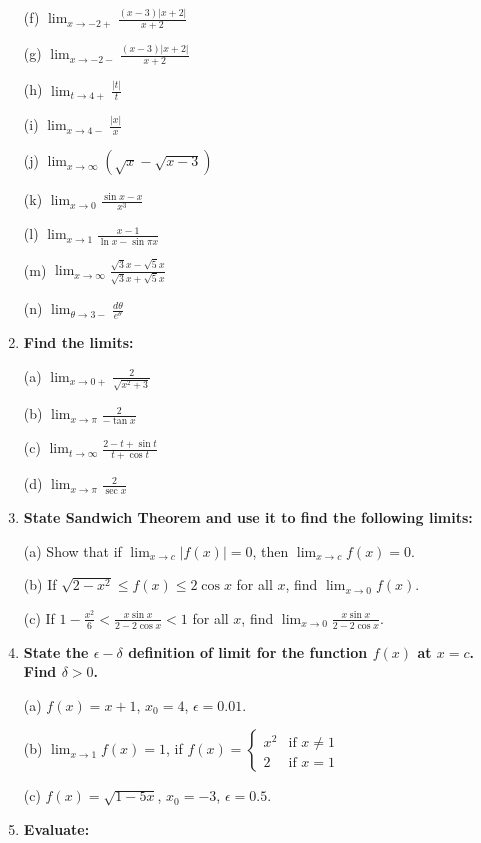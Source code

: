 \documentclass{article}
\begin{document}
\begin{enumerate}
(f) $\lim_{x \to -2+} \frac{(x - 3)|x + 2|}{x + 2}$


(g) $\lim_{x \to -2-} \frac{(x - 3)|x + 2|}{x + 2}$

(h) $\lim_{t \to 4+} \frac{|t|}{t}$

(i) $\lim_{x \to 4-} \frac{|x|}{x}$

(j) $\lim_{x \to \infty} \left(\sqrt{x} - \sqrt{x - 3}\right)$

(k) $\lim_{x \to 0} \frac{\sin x - x}{x^3}$

(l) $\lim_{x \to 1} \frac{x - 1}{\ln x - \sin \pi x}$

(m) $\lim_{x \to \infty} \frac{\sqrt{3} x - \sqrt{5} x}{\sqrt{3} x + \sqrt{5} x}$

(n) $\lim_{\theta \to 3-} \frac{d\theta}{e^{\theta}}$

\item \textbf{Find the limits:}

(a) $\lim_{x \to 0+} \frac{2}{\sqrt{x^2 + 3}}$

(b) $\lim_{x \to \pi} \frac{2}{-\tan x}$

(c) $\lim_{t \to \infty} \frac{2 - t + \sin t}{t + \cos t}$

(d) $\lim_{x \to \pi} \frac{2}{\sec x}$

\item \textbf{State Sandwich Theorem and use it to find the following limits:}

(a) Show that if $\lim_{x \to c} |f(x)| = 0$, then $\lim_{x \to c} f(x) = 0$.

(b) If $\sqrt{2 - x^2} \le f(x) \le 2 \cos x$ for all $x$, find $\lim_{x \to 0} f(x)$.

(c) If $1 - \frac{x^2}{6} < \frac{x \sin x}{2 - 2 \cos x} < 1$ for all $x$, find $\lim_{x \to 0} \frac{x \sin x}{2 - 2 \cos x}$.

\item \textbf{State the $\epsilon - \delta$ definition of limit for the function $f(x)$ at $x = c$. Find $\delta > 0$.}

(a) $f(x) = x + 1$, $x_0 = 4$, $\epsilon = 0.01$.

(b) $\lim_{x \to 1} f(x) = 1$, if $f(x) = 
\begin{cases}
x^2 & \text{if } x \neq 1 \\
2 & \text{if } x = 1
\end{cases}$

(c) $f(x) = \sqrt{1 - 5x}$, $x_0 = -3$, $\epsilon = 0.5$.

\item \textbf{Evaluate:}


\end{enumerate}
\end{document}
